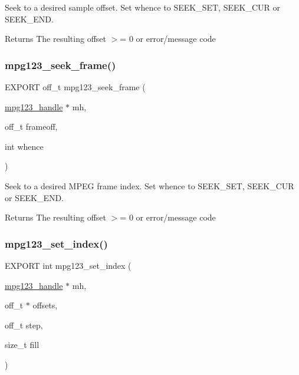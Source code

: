 Seek to a desired sample offset. Set whence to S\+E\+E\+K\+\_\+\+S\+ET, S\+E\+E\+K\+\_\+\+C\+UR or S\+E\+E\+K\+\_\+\+E\+ND. \begin{DoxyReturn}{Returns}
The resulting offset $>$= 0 or error/message code 
\end{DoxyReturn}
\mbox{\label{group__mpg123__seek_ga5e0882914fcb29fbc6018711b18b012a}} 
\subsubsection{\texorpdfstring{mpg123\+\_\+seek\+\_\+frame()}{mpg123\_seek\_frame()}}
{\footnotesize\ttfamily E\+X\+P\+O\+RT off\+\_\+t mpg123\+\_\+seek\+\_\+frame (\begin{DoxyParamCaption}\item[{\hyperlink{group__mpg123__init_ga6728e2839a395f3a07d4514da659faca}{mpg123\+\_\+handle} $\ast$}]{mh,  }\item[{off\+\_\+t}]{frameoff,  }\item[{int}]{whence }\end{DoxyParamCaption})}

Seek to a desired M\+P\+EG frame index. Set whence to S\+E\+E\+K\+\_\+\+S\+ET, S\+E\+E\+K\+\_\+\+C\+UR or S\+E\+E\+K\+\_\+\+E\+ND. \begin{DoxyReturn}{Returns}
The resulting offset $>$= 0 or error/message code 
\end{DoxyReturn}
\mbox{\label{group__mpg123__seek_ga176cdb470902ebbc4839c99d7e20791e}} 
\subsubsection{\texorpdfstring{mpg123\+\_\+set\+\_\+index()}{mpg123\_set\_index()}}
{\footnotesize\ttfamily E\+X\+P\+O\+RT int mpg123\+\_\+set\+\_\+index (\begin{DoxyParamCaption}\item[{\hyperlink{group__mpg123__init_ga6728e2839a395f3a07d4514da659faca}{mpg123\+\_\+handle} $\ast$}]{mh,  }\item[{off\+\_\+t $\ast$}]{offsets,  }\item[{off\+\_\+t}]{step,  }\item[{size\+\_\+t}]{fill }\end{DoxyParamCaption})}

